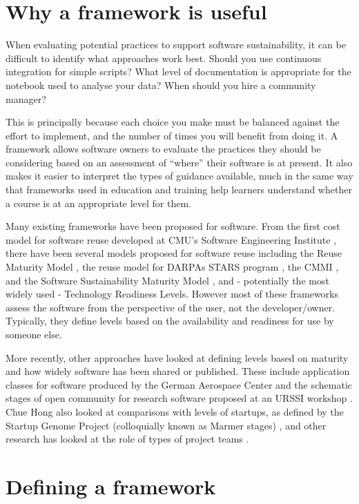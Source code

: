 \documentclass[conference]{IEEEtran}
\begin{document}
\section{Why a framework is useful}
When evaluating potential practices to support software sustainability, it can be difficult to identify what approaches work best. Should you use continuous integration for simple scripts? What level of documentation is appropriate for the notebook used to analyse your data? When should you hire a community manager?

This is principally because each choice you make must be balanced against the effort to implement, and the number of times you will benefit from doing it. A framework allows software owners to evaluate the practices they should be considering based on an assessment of “where” their software is at present. It also makes it easier to interpret the types of guidance available, much in the same way that frameworks used in education and training help learners understand whether a course is at an appropriate level for them.

Many existing frameworks have been proposed for software. From the first cost model for software reuse developed at CMU's Software Engineering Institute \cite{Holibaugh}, there have been several models proposed for software reuse including the Reuse Maturity Model \cite{Koltun}, the reuse model for DARPAs STARS program \cite{Frazier}, the CMMI \cite{CMMI}, and the Software Sustainability Maturity Model \cite{Gardler}, and - potentially the most widely used - Technology Readiness Levels. However most of these frameworks assess the software from the perspective of the user, not the developer/owner. Typically, they define levels based on the availability and readiness for use by someone else.

More recently, other approaches have looked at defining levels based on maturity and how widely software has been shared or published. These include application classes for software produced by the German Aerospace Center \cite{Schlauch} and the schematic stages of open community for research software proposed at an URSSI workshop \cite{Benthall}. Chue Hong \cite{Chue Hong} also looked at comparisons with levels of startups, as defined by the Startup Genome Project (colloquially known as Marmer stages) \cite{Marmer}, and other research has looked at the role of types of project teams \cite{Cohoon}.


\section{Defining a framework}
\end{document}
